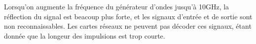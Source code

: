 Lorsqu'on augmente la fréquence du générateur d'ondes jusqu'à 10GHz, la réflection du signal est beacoup plus forte, et les signaux d'entrée et de sortie sont non reconnaissables. Les cartes réseaux ne peuvent pas décoder ces signaux, étant donnée que la longeur des impulsions est trop courte.
